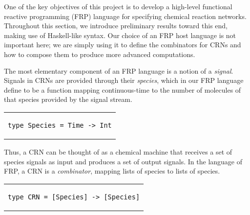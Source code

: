 One of the key objectives of this project is to develop a high-level functional reactive programming (FRP) language for specifying chemical reaction networks.
Throughout this section, we introduce preliminary results toward this end, making use of Haskell-like syntax.
Our choice of an FRP host language is not important here; we are simply using it to define the combinators for CRNs and how to compose them to produce more advanced computations.

The most elementary component of an FRP language is a notion of a \emph{signal}.
Signals in CRNs are provided through their \emph{species}, which in our FRP language define to be a function mapping continuous-time to the number of molecules of that species provided by the signal stream.
\begin{center}\begin{tabular}{c}\begin{lstlisting}
type Species = Time -> Int
\end{lstlisting}\end{tabular}\end{center}
Thus, a CRN can be thought of as a chemical machine that receives a set of species signals as input and produces a set of output signals.
In the language of FRP, a CRN is a \emph{combinator}, mapping lists of species to lists of species.
\begin{center}\begin{tabular}{c}\begin{lstlisting}
type CRN = [Species] -> [Species]
\end{lstlisting}\end{tabular}\end{center}

